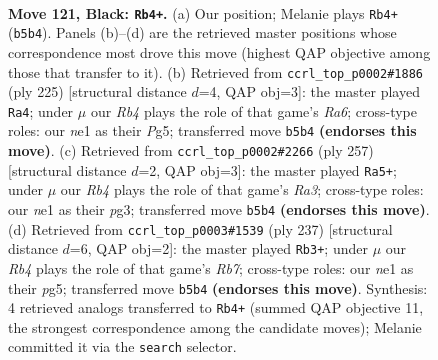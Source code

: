 \documentclass[11pt]{article}
\begin{document}
\clearpage

\begin{figure}[p]\centering
\begin{subfigure}{0.46\textwidth}\centering
\resizebox{\linewidth}{!}{%
\newchessgame
\chessboard[
  setfen={8/4k3/R7/1r6/5KP1/8/8/4N3 b - - 26 121},
  showmover=false,
  pgfstyle=straightmove, color=movearrow, markmove={b5-b4}
]}
\caption{}
\end{subfigure}\hfill
\begin{subfigure}{0.46\textwidth}\centering
\resizebox{\linewidth}{!}{%
\newchessgame
\chessboard[
  setfen={8/6k1/3R4/6p1/6P1/r7/5PK1/8 b - - 56 113},
  showmover=false,
  pgfstyle=straightmove, color=movearrow, markmove={a3-a4}
]}
\caption{}
\end{subfigure}
\\[4pt]
\begin{subfigure}{0.46\textwidth}\centering
\resizebox{\linewidth}{!}{%
\newchessgame
\chessboard[
  setfen={6k1/2R5/r7/5KP1/8/6P1/8/8 b - - 54 129},
  showmover=false,
  pgfstyle=straightmove, color=movearrow, markmove={a6-a5}
]}
\caption{}
\end{subfigure}\hfill
\begin{subfigure}{0.46\textwidth}\centering
\resizebox{\linewidth}{!}{%
\newchessgame
\chessboard[
  setfen={8/6k1/4R3/6P1/6P1/6K1/1r6/8 b - - 12 119},
  showmover=false,
  pgfstyle=straightmove, color=movearrow, markmove={b2-b3}
]}
\caption{}
\end{subfigure}
\caption{\textbf{Move 121, Black: \texttt{Rb4+}.} (a) Our position; Melanie plays \texttt{Rb4+} (\texttt{b5b4}). Panels (b)--(d) are the retrieved master positions whose correspondence most drove this move (highest QAP objective among those that transfer to it). (b) Retrieved from \texttt{ccrl\_top\_p0002\#1886} (ply 225) [structural distance $d$=4, QAP obj=3]: the master played \texttt{Ra4}; under $\mu$ our \emph{Rb4} plays the role of that game's \emph{Ra6}; cross-type roles: our \emph{n}e1 as their \emph{P}g5; transferred move \texttt{b5b4} \textbf{(endorses this move)}. (c) Retrieved from \texttt{ccrl\_top\_p0002\#2266} (ply 257) [structural distance $d$=2, QAP obj=3]: the master played \texttt{Ra5+}; under $\mu$ our \emph{Rb4} plays the role of that game's \emph{Ra3}; cross-type roles: our \emph{n}e1 as their \emph{p}g3; transferred move \texttt{b5b4} \textbf{(endorses this move)}. (d) Retrieved from \texttt{ccrl\_top\_p0003\#1539} (ply 237) [structural distance $d$=6, QAP obj=2]: the master played \texttt{Rb3+}; under $\mu$ our \emph{Rb4} plays the role of that game's \emph{Rb7}; cross-type roles: our \emph{n}e1 as their \emph{p}g5; transferred move \texttt{b5b4} \textbf{(endorses this move)}. Synthesis: 4 retrieved analogs transferred to \texttt{Rb4+} (summed QAP objective 11, the strongest correspondence among the candidate moves); Melanie committed it via the \texttt{search} selector.}
\label{fig:thought-m241}
\end{figure}
\end{document}

